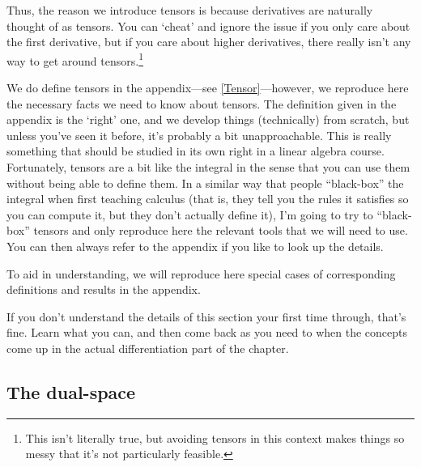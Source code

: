 Thus, the reason we introduce tensors is because derivatives are naturally thought of as tensors.  You can `cheat' and ignore the issue if you only care about the first derivative, but if you care about higher derivatives, there really isn't any way to get around tensors.\footnote{This isn't literally true, but avoiding tensors in this context makes things so messy that it's not particularly feasible.}

We do define tensors in the appendix---see \cref{Tensor}---however, we reproduce here the necessary facts we need to know about tensors.  The definition given in the appendix is the `right' one, and we develop things (technically) from scratch, but unless you've seen it before, it's probably a bit unapproachable.  This is really something that should be studied in its own right in a linear algebra course.  Fortunately, tensors are a bit like the integral in the sense that you can use them without being able to define them.  In a similar way that people ``black-box'' the integral when first teaching calculus (that is, they tell you the rules it satisfies so you can compute it, but they don't actually define it), I'm going to try to ``black-box'' tensors and only reproduce here the relevant tools that we will need to use.  You can then always refer to the appendix if you like to look up the details.

To aid in understanding, we will reproduce here special cases of corresponding definitions and results in the appendix.

\begin{displayquote}
If you don't understand the details of this section your first time through, that's fine.  Learn what you can, and then come back as you need to when the concepts come up in the actual differentiation part of the chapter.
\end{displayquote}

\subsection{The dual-space}

